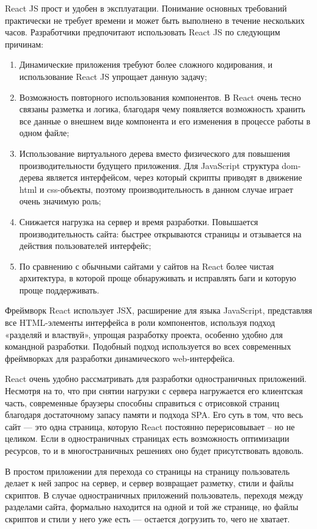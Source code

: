 \documentclass[master, och, diploma]{SCWorks}
\begin{document}
React JS прост и удобен в эксплуатации. Понимание основных требований практически не требует времени и может быть выполнено в течение нескольких часов. Разработчики предпочитают использовать React JS по следующим причинам:
\begin{enumerate}
    \item Динамические приложения требуют более сложного кодирования, и использование React JS упрощает данную задачу;
    \item Возможность повторного использования компонентов. В React очень тесно связаны разметка и логика, благодаря чему появляется возможность хранить все данные о внешнем виде компонента и его изменения в процессе работы в одном файле;
    \item Использование виртуального дерева вместо физического для повышения производительности будущего приложения. Для JavaScript структура dom-дерева является интерфейсом, через который скрипты приводят в движение html и css-объекты, поэтому производительность в данном случае играет очень значимую роль;
    \item Снижается нагрузка на сервер и время разработки. Повышается производительность сайта: быстрее открываются страницы и отзывается на действия пользователей интерфейс;
    \item По сравнению с обычными сайтами у сайтов на React более чистая архитектура, в которой проще обнаруживать и исправлять баги и которую проще поддерживать. \cite{rjs_vs_rn}\cite{rjs}
\end{enumerate}

Фреймворк React использует JSX, расширение для языка JavaScript, представляя все HTML-элементы интерфейса в роли компонентов, используя подход «разделяй и властвуй», упрощая разработку проекта, особенно удобно для командной разработки. Подобный подход используется во всех современных фреймворках для разработки динамического web-интерфейса\cite{Ershov_web}.

React очень удобно рассматривать для разработки одностраничных приложений. Несмотря на то, что при снятии нагрузки с сервера нагружается его клиентская часть, современные браузеры способны справиться с отрисовкой страниц благодаря достаточному запасу памяти и подхода SPA. Его суть в том, что весь сайт — это одна страница, которую React постоянно перерисовывает – но не целиком. Если в одностраничных страницах есть возможность оптимизации ресурсов, то и в многостраничных решениях оно будет присутствовать вдоволь.

В простом приложении для перехода со страницы на страницу пользователь делает к ней запрос на сервер, и сервер возвращает разметку, стили и файлы скриптов. В случае одностраничных приложений пользователь, переходя между разделами сайта, формально находится на одной и той же странице, но файлы скриптов и стили у него уже есть — остается догрузить то, чего не хватает. 
\end{document}
